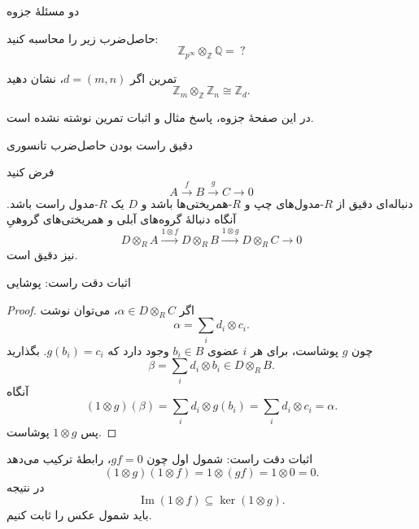 \begin{frame}[t]{دو مسئلهٔ جزوه}
    \label{lec19:tensor-exercises}
    \begin{example}
        حاصل‌ضرب زیر را محاسبه کنید:
        \[
            \mathbb Z_{p^\infty}\otimes_{\mathbb Z}\mathbb Q=\ ?
        \]
    \end{example}
    \begin{block}{تمرین}
        اگر $d=(m,n)$، نشان دهید
        \[
            \mathbb Z_m\otimes_{\mathbb Z}\mathbb Z_n\cong\mathbb Z_d.
        \]
    \end{block}
    در این صفحهٔ جزوه، پاسخ مثال و اثبات تمرین نوشته نشده است.
\end{frame}

\begin{frame}[t]{دقیق راست بودن حاصل‌ضرب تانسوری}
    \label{lec19:right-exactness}
    \begin{theorem}
    فرض کنید
    \[
        A\xrightarrow{f}B\xrightarrow{g}C\longrightarrow0
    \]
    دنباله‌ای دقیق از $R$-مدول‌های چپ و $R$-همریختی‌ها باشد و $D$ یک
    $R$-مدول راست باشد. آنگاه دنبالهٔ گروه‌های آبلی و همریختی‌های گروهیِ
    \[
        D\otimes_R A\xrightarrow{1\otimes f}
        D\otimes_R B\xrightarrow{1\otimes g}
        D\otimes_R C\longrightarrow0
    \]
    نیز دقیق است.
    \end{theorem}
\end{frame}

\begin{frame}[t]{اثبات دقت راست: پوشایی}
    \label{lec19:right-exact-surjective}
    \begin{proof}
    اگر $\alpha\in D\otimes_R C$، می‌توان نوشت
    \[
        \alpha=\sum_i d_i\otimes c_i.
    \]
    چون $g$ پوشاست، برای هر $i$ عضوی $b_i\in B$ وجود دارد که $g(b_i)=c_i$.
    بگذارید
    \[
        \beta=\sum_i d_i\otimes b_i\in D\otimes_R B.
    \]
    آنگاه
    \[
        (1\otimes g)(\beta)
        =\sum_i d_i\otimes g(b_i)
        =\sum_i d_i\otimes c_i=\alpha.
    \]
    پس $1\otimes g$ پوشاست.
    \end{proof}
\end{frame}

\begin{frame}[t]{اثبات دقت راست: شمول اول}
    \label{lec19:right-exact-inclusion}
    چون $gf=0$، رابطهٔ ترکیب می‌دهد
    \[
        (1\otimes g)(1\otimes f)
        =1\otimes(gf)=1\otimes0=0.
    \]
    در نتیجه
    \[
        \operatorname{Im}(1\otimes f)\subseteq\ker(1\otimes g).
    \]
    باید شمول عکس را ثابت کنیم.
\end{frame}

